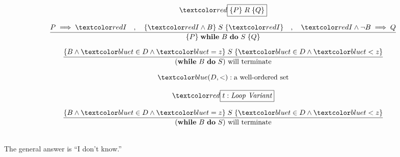 \begin{frame}
  \[
    \red{\boxed{\set{P}\; R\; \set{Q}}}
  \]
  
  \[
    \dfrac{P \implies \red{I} \quad,\quad \{\red{I} \wedge B\}\; S\; \{\red{I}\}
    \quad,\quad \red{I} \land \lnot B \implies Q}
    {\{P\}\; \textbf{while}\ B\ \textbf{do}\ S\; \{Q\}}
  \]
  
  \pause
  \begin{center}
  \end{center}
  
  \pause
  \[
    \dfrac{\{B \land \blue{t \in D} \land \blue{t = z}\}\; S\; \{\blue{t \in D} \land \blue{t < z} \}}
    {(\textbf{while}\ B\ \textbf{do}\ S) \text{ will terminate}}
  \]
  
  \[
    \blue{(D, <): \text{a well-ordered set}}
  \]
  
  \pause
  \[
    \red{\boxed{t: \text{\it Loop Variant}}}
  \]
\end{frame}

\begin{frame}
  \[
    \dfrac{\{B \land \blue{t \in D} \land \blue{t = z}\}\; S\; \{\blue{t \in D} \land \blue{t < z} \}}
    {(\textbf{while}\ B\ \textbf{do}\ S) \text{ will terminate}}
  \]
  
  \pause
  \vspace{0.30cm}
  \begin{center}
      \\[10pt]  \pause
    The general answer is ``I don't know.''
  \end{center}
  
  \pause
\end{frame}
